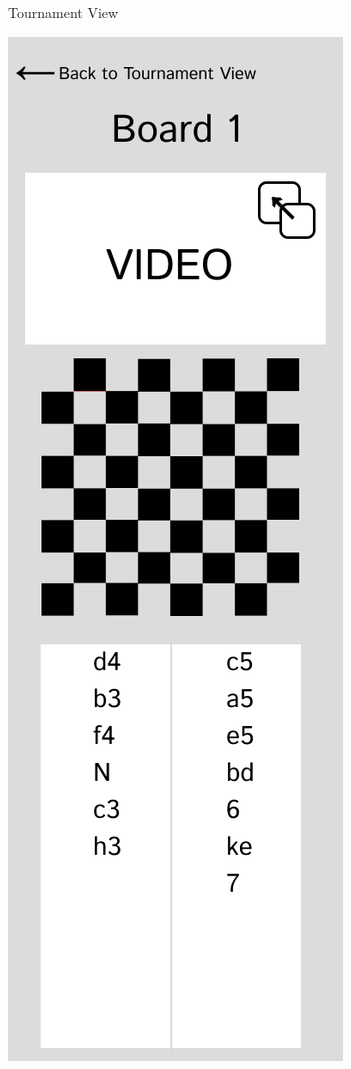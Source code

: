 \begin{figure}[h!]
\begin{subfigure}[h!]{0.2\linewidth}
        \caption{Tournament View}
        \label{fig:phone-tournament-view}
    \end{subfigure}
    \hfill
    \begin{subfigure}[h!]{0.2\linewidth}
        \centering
        \includegraphics[width=\linewidth]{figures/methods/wireframes/phone-board-view.png}

\end{subfigure}
\end{figure}
